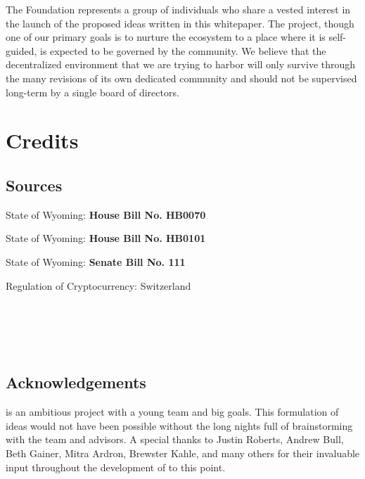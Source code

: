 \documentclass{kwp-builder}
\begin{document}
\tab The \konjure Foundation represents a group of individuals who share a vested interest in the launch of the proposed ideas written in this whitepaper. The \konjure project, though one of our primary goals is to nurture the ecosystem to a place where it is self-guided, is expected to be governed by the community. We believe that the decentralized environment that we are trying to harbor will only survive through the many revisions of its own dedicated community and should not be supervised long-term by a single board of directors.


\section{Credits}
\subsection{Sources}

\begin{thebibliography}{9}
State of Wyoming: \textbf{House Bill No. HB0070}
\\\texttt{}

State of Wyoming: \textbf{House Bill No. HB0101}
\\\texttt{}

State of Wyoming: \textbf{Senate Bill No. 111}
\\\texttt{}
 
Regulation of Cryptocurrency: Switzerland
\\\texttt{}

\cardano
\\\texttt{}

\ipfs
\\\texttt{ }
\end{thebibliography}

\subsection{Acknowledgements}

\tab \konjure is an ambitious project with a young team and big goals. This formulation of ideas would not have been possible without the long nights full of brainstorming with the \konjure team and advisors. A special thanks to Justin Roberts, Andrew Bull, Beth Gainer, Mitra Ardron, Brewster Kahle, and many others for their invaluable input throughout the development of \konjure to this point.
\end{document}
